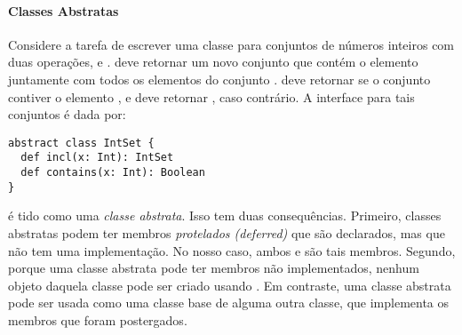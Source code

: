 \paragraph{Classes Abstratas}

Considere a tarefa de escrever uma classe para conjuntos de n\'{u}meros inteiros com 
duas opera\c{c}\~{o}es,  e .  deve retornar
um novo conjunto que cont\'{e}m o elemento  juntamente com todos os elementos 
do conjunto .  deve retornar  se o conjunto 
 contiver o elemento , e deve retornar , caso contr\'{a}rio.
A interface para tais conjuntos \'{e} dada por:
\begin{lstlisting}
abstract class IntSet {
  def incl(x: Int): IntSet
  def contains(x: Int): Boolean
}
\end{lstlisting}

 \'{e} tido como uma {\em classe abstrata}. Isso tem duas consequ\^{e}ncias. 
Primeiro, classes abstratas podem ter membros {\em protelados (deferred)} que s\~{a}o 
declarados, mas que n\~{a}o tem uma implementa\c{c}\~{a}o. No nosso caso, ambos  e 
 s\~{a}o tais membros. Segundo, porque uma classe abstrata pode ter 
membros n\~{a}o implementados, nenhum objeto daquela classe pode ser criado usando .
Em contraste, uma classe abstrata pode ser usada como uma classe base de alguma outra
classe, que implementa os membros que foram postergados. 

